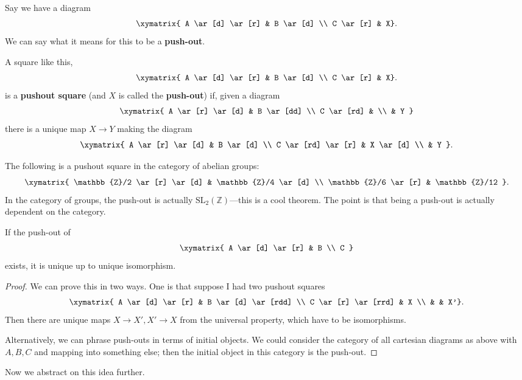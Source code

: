 Say we have a diagram
\[ 
\xymatrix{
A \ar[d] \ar[r] &  B \ar[d] \\
C \ar[r] &  X}.
\]
We can say what it means for this to be a \textbf{push-out}.

\begin{definition} 
A square like this,
\[ 
\xymatrix{
A \ar[d] \ar[r] &  B \ar[d] \\
C \ar[r] &  X}.
\]
is a \textbf{pushout square} (and $X$ is called the \textbf{push-out}) if, given a diagram
\[ \xymatrix{
A \ar[r] \ar[d]  &  B \ar[dd] \\ 
C \ar[rd] & \\
& Y
}\]
there is a unique map $X \to Y$ making the diagram
\[ \xymatrix{
A \ar[r] \ar[d]  &  B \ar[d] \\ 
C \ar[rd] \ar[r] & X  \ar[d]  \\
& Y
}.\]
\end{definition} 

\begin{example} 
The following is a pushout square in the category of abelian groups:
\[ \xymatrix{
\mathbb{Z}/2 \ar[r] \ar[d]  &  \mathbb{Z}/4 \ar[d]  \\ 
\mathbb{Z}/6 \ar[r] &  \mathbb{Z}/12
}.\]
In the category of groups, the push-out is actually
$\mathrm{SL}_2(\mathbb{Z})$---this is a cool theorem. The point is that being a
push-out is actually dependent on the category.
\end{example} 

\begin{proposition} 
If the push-out of 
\[ \xymatrix{
A \ar[d] \ar[r] & B \\
C
}\]
exists, it is unique up to unique isomorphism. 
\end{proposition} 
\begin{proof} 
We can prove this in two ways. One is that suppose I had two pushout squares
\[ 
\xymatrix{
A \ar[d] \ar[r] &  B \ar[d] \ar[rdd] \\
C \ar[r] \ar[rrd] &  X \\
& & X'}.
\]
Then there are unique maps $X \to X', X' \to X$ from the universal property,
which have to be isomorphisms. 

Alternatively, we can phrase push-outs in terms of initial objects. We could
consider the category of all cartesian diagrams as above with $A,B,C$ and
mapping into something else; then the initial
object in this category is the push-out.
\end{proof} 

Now we abstract on this idea further.

